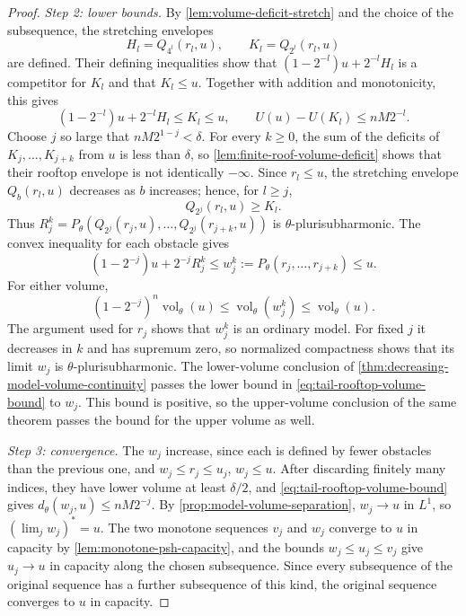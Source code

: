 \begin{proof}
\emph{Step 2: lower bounds.} By \cref{lem:volume-deficit-stretch} and the choice of the subsequence, the stretching envelopes
\[
 H_l=Q_{4^l}(r_l,u),\qquad K_l=Q_{2^l}(r_l,u)
\]
are defined. Their defining inequalities show that $(1-2^{-l})u+2^{-l}H_l$ is a competitor for $K_l$ and that $K_l\leq u$. Together with addition and monotonicity, this gives
\[
 (1-2^{-l})u+2^{-l}H_l\leq K_l\leq u,
 \qquad U(u)-U(K_l)\leq nM2^{-l}.
\]
Choose $j$ so large that $nM2^{1-j}<\delta$. For every $k\geq0$, the sum of the deficits of $K_j,\ldots,K_{j+k}$ from $u$ is less than $\delta$, so \cref{lem:finite-roof-volume-deficit} shows that their rooftop envelope is not identically $-\infty$. Since $r_l\leq u$, the stretching envelope $Q_b(r_l,u)$ decreases as $b$ increases; hence, for $l\geq j$,
\[
 Q_{2^j}(r_l,u)\geq K_l.
\]
Thus $R_j^k=P_\theta(Q_{2^j}(r_j,u),\ldots,Q_{2^j}(r_{j+k},u))$ is $\theta$-plurisubharmonic. The convex inequality for each obstacle gives
\[
 (1-2^{-j})u+2^{-j}R_j^k
       \leq w_j^k:=P_\theta(r_j,\ldots,r_{j+k})\leq u.
\]
For either volume,
\begin{equation}\label{eq:tail-rooftop-volume-bound}
 (1-2^{-j})^n\operatorname{vol}_\theta(u)
 \leq\operatorname{vol}_\theta(w_j^k)
 \leq\operatorname{vol}_\theta(u).
\end{equation}
The argument used for $r_j$ shows that $w_j^k$ is an ordinary model. For fixed $j$ it decreases in $k$ and has supremum zero, so normalized compactness shows that its limit $w_j$ is $\theta$-plurisubharmonic. The lower-volume conclusion of \cref{thm:decreasing-model-volume-continuity} passes the lower bound in \eqref{eq:tail-rooftop-volume-bound} to $w_j$. This bound is positive, so the upper-volume conclusion of the same theorem passes the bound for the upper volume as well.

\emph{Step 3: convergence.} The $w_j$ increase, since each is defined by fewer obstacles than the previous one, and $w_j\leq r_j\leq u_j$, $w_j\leq u$. After discarding finitely many indices, they have lower volume at least $\delta/2$, and \eqref{eq:tail-rooftop-volume-bound} gives $d_\theta(w_j,u)\leq nM2^{-j}$. By \cref{prop:model-volume-separation}, $w_j\to u$ in $L^1$, so $(\lim_jw_j)^*=u$. The two monotone sequences $v_j$ and $w_j$ converge to $u$ in capacity by \cref{lem:monotone-psh-capacity}, and the bounds $w_j\leq u_j\leq v_j$ give $u_j\to u$ in capacity along the chosen subsequence. Since every subsequence of the original sequence has a further subsequence of this kind, the original sequence converges to $u$ in capacity.
\end{proof}

